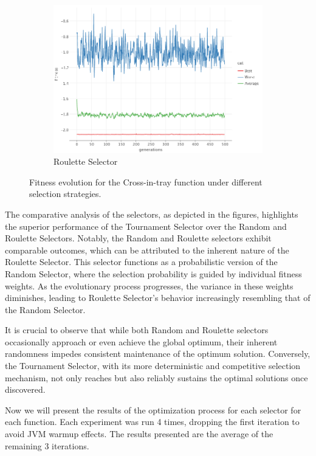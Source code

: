 \begin{figure}[ht!]
\begin{subfigure}{.45\textwidth}
      \includegraphics[width=\linewidth]{img/cross_in_tray_roulette.png}
      \caption{Roulette Selector}
    \end{subfigure}
    \caption{
      Fitness evolution for the Cross-in-tray function under different selection 
      strategies.
    }
  \end{figure}

  The comparative analysis of the selectors, as depicted in the figures, 
  highlights the superior performance of the Tournament Selector over the Random 
  and Roulette Selectors. Notably, the Random and Roulette selectors exhibit 
  comparable outcomes, which can be attributed to the inherent nature of the 
  Roulette Selector. This selector functions as a probabilistic version of the 
  Random Selector, where the selection probability is guided by individual 
  fitness weights. As the evolutionary process progresses, the variance in these 
  weights diminishes, leading to Roulette Selector's behavior increasingly 
  resembling that of the Random Selector.

  It is crucial to observe that while both Random and Roulette selectors 
  occasionally approach or even achieve the global optimum, their inherent 
  randomness impedes consistent maintenance of the optimum solution. Conversely, 
  the Tournament Selector, with its more deterministic and competitive selection 
  mechanism, not only reaches but also reliably sustains the optimal solutions 
  once discovered.

  Now we will present the results of the optimization process for each selector
  for each function.
  Each experiment was run 4 times, dropping the first iteration to avoid
  JVM warmup effects. The results presented are the average of the remaining
  3 iterations.

